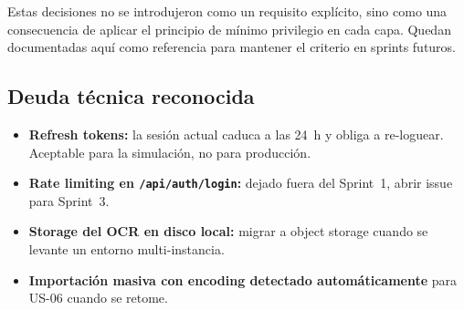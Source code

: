 Estas decisiones no se introdujeron como un requisito explícito, sino como una consecuencia de aplicar el principio de mínimo privilegio en cada capa. Quedan documentadas aquí como referencia para mantener el criterio en sprints futuros.

\subsection{Deuda técnica reconocida}

\begin{itemize}
\item \textbf{Refresh tokens:} la sesión actual caduca a las 24~h y obliga a re-loguear. Aceptable para la simulación, no para producción.
\item \textbf{Rate limiting en \texttt{/api/auth/login}:} dejado fuera del Sprint~1, abrir issue para Sprint~3.
\item \textbf{Storage del OCR en disco local:} migrar a object storage cuando se levante un entorno multi-instancia.
\item \textbf{Importación masiva con encoding detectado automáticamente} para US-06 cuando se retome.
\end{itemize}

